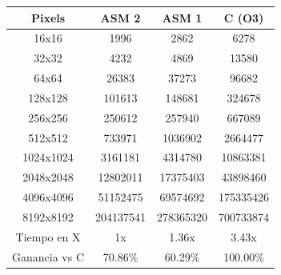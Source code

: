 \begin{table}[!htbp]
	\centering
	\footnotesize
	\begin{tabular}{| c | c | c | c |}
		\hline
Pixels &ASM 2 & ASM 1 & C (O3) \\ \hline
16x16 & 1996 & 2862 & 6278 \\ \hline
32x32  &4232  & 4869 & 13580 \\ \hline
64x64  & 26383 & 37273 & 96682 \\ \hline
128x128 & 101613 & 148681 & 324678 \\ \hline
256x256  & 250612  & 257940 & 667089 \\ \hline
512x512   & 733971 & 1036902 & 2664477 \\ \hline
1024x1024 & 3161181 & 4314780 & 10863381 \\ \hline
2048x2048  & 12802011 & 17375403 & 43898460 \\ \hline
4096x4096 & 51152475 & 69574692 & 175335426 \\ \hline
8192x8192 & 204137541 & 278365320 & 700733874 \\ \hline
Tiempo en X& 1x & 1.36x & 3.43x \\ \hline
Ganancia vs C & 70.86\% & 60.29\%	& 100.00\% \\ \hline

	\end{tabular}
\end{table}